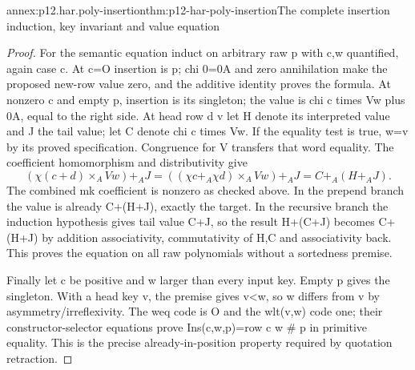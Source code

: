 \begin{annexitem}{annex:p12.har.poly-insertion}{thm:p12-har-poly-insertion}{The complete insertion induction, key invariant and value equation}
\begin{proof}
For the semantic equation induct on arbitrary raw p with c,w quantified,
again case c. At c=O insertion is p; chi 0=0A and zero annihilation
make the proposed new-row value zero, and the additive identity proves
the formula. At nonzero c and empty p, insertion is its singleton;
the value is chi c times Vw plus 0A, equal to the right side.
At head row d v let H denote its interpreted value and J the tail
value; let C denote chi c times Vw. If the equality test is true,
w=v by its proved specification. Congruence for V transfers that
word equality. The coefficient homomorphism and distributivity give
\[
 (\chi(c+d)\times_A Vw)+_A J
   =((\chi c+_A\chi d)\times_A Vw)+_A J
   =C+_A(H+_A J).
\]
The combined mk coefficient is nonzero as checked above. In the
prepend branch the value is already C+(H+J), exactly the target.
In the recursive branch the induction hypothesis gives tail value
C+J, so the result H+(C+J) becomes C+(H+J) by addition associativity,
commutativity of H,C and associativity back. This proves the equation
on all raw polynomials without a sortedness premise.

Finally let c be positive and w larger than every input key. Empty
p gives the singleton. With a head key v, the premise gives v<w,
so w differs from v by asymmetry/irreflexivity. The weq code is O
and the wlt(v,w) code one; their constructor-selector equations prove
Ins(c,w,p)=row c w \# p in primitive equality. This is the precise
already-in-position property required by quotation retraction.
\end{proof}
\end{annexitem}

